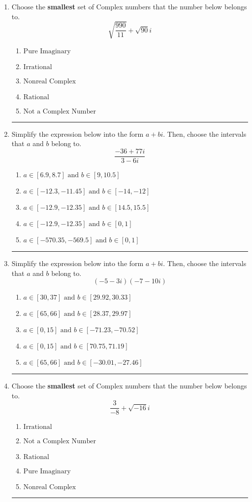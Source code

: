 \documentclass[14pt]{extbook}
\newcommand{\litem}[1]{\item#1\hspace*{-1cm}\rule{\textwidth}{0.4pt}}
\begin{document}
\begin{enumerate}
\litem{
Choose the \textbf{smallest} set of Complex numbers that the number below belongs to.\[ \sqrt{\frac{990}{11}}+\sqrt{90} i \]\begin{enumerate}[label=\Alph*.]
\item \( \text{Pure Imaginary} \)
\item \( \text{Irrational} \)
\item \( \text{Nonreal Complex} \)
\item \( \text{Rational} \)
\item \( \text{Not a Complex Number} \)

\end{enumerate} }
\litem{
Simplify the expression below into the form $a+bi$. Then, choose the intervals that $a$ and $b$ belong to.\[ \frac{-36 + 77 i}{3 - 6 i} \]\begin{enumerate}[label=\Alph*.]
\item \( a \in [6.9, 8.7] \text{ and } b \in [9, 10.5] \)
\item \( a \in [-12.3, -11.45] \text{ and } b \in [-14, -12] \)
\item \( a \in [-12.9, -12.35] \text{ and } b \in [14.5, 15.5] \)
\item \( a \in [-12.9, -12.35] \text{ and } b \in [0, 1] \)
\item \( a \in [-570.35, -569.5] \text{ and } b \in [0, 1] \)

\end{enumerate} }
\litem{
Simplify the expression below into the form $a+bi$. Then, choose the intervals that $a$ and $b$ belong to.\[ (-5 - 3 i)(-7 - 10 i) \]\begin{enumerate}[label=\Alph*.]
\item \( a \in [30, 37] \text{ and } b \in [29.92, 30.33] \)
\item \( a \in [65, 66] \text{ and } b \in [28.37, 29.97] \)
\item \( a \in [0, 15] \text{ and } b \in [-71.23, -70.52] \)
\item \( a \in [0, 15] \text{ and } b \in [70.75, 71.19] \)
\item \( a \in [65, 66] \text{ and } b \in [-30.01, -27.46] \)

\end{enumerate} }
\litem{
Choose the \textbf{smallest} set of Complex numbers that the number below belongs to.\[ \frac{3}{-8}+\sqrt{-16}i \]\begin{enumerate}[label=\Alph*.]
\item \( \text{Irrational} \)
\item \( \text{Not a Complex Number} \)
\item \( \text{Rational} \)
\item \( \text{Pure Imaginary} \)
\item \( \text{Nonreal Complex} \)


\end{enumerate}}
\end{enumerate}
\end{document}
